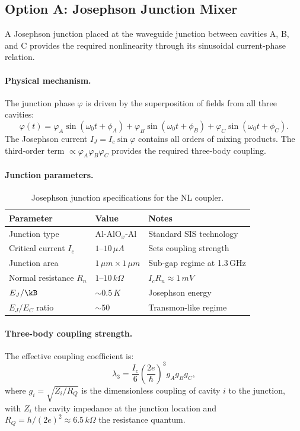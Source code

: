 \documentclass[12pt,a4paper]{article}
\begin{document}
\subsection{Option A: Josephson Junction Mixer}

A Josephson junction placed at the waveguide junction between cavities A, B, and C provides the required nonlinearity through its sinusoidal current-phase relation.

\paragraph{Physical mechanism.} The junction phase $\varphi$ is driven by the superposition of fields from all three cavities:
\begin{equation}
\varphi(t) = \varphi_A \sin(\omega_0 t + \phi_A) + \varphi_B \sin(\omega_0 t + \phi_B) + \varphi_C \sin(\omega_0 t + \phi_C).
\end{equation}
The Josephson current $I_J = I_c \sin\varphi$ contains all orders of mixing products. The third-order term $\propto \varphi_A \varphi_B \varphi_C$ provides the required three-body coupling.

\paragraph{Junction parameters.}
\begin{table}[H]
\centering
\caption{Josephson junction specifications for the NL coupler.}
\begin{tabular}{lll}
\toprule
\textbf{Parameter} & \textbf{Value} & \textbf{Notes} \\
\midrule
Junction type & Al-AlO$_x$-Al & Standard SIS technology \\
Critical current $I_c$ & $1$--$10\,\si{\mu A}$ & Sets coupling strength \\
Junction area & $1\,\si{\mu m} \times 1\,\si{\mu m}$ & Sub-gap regime at 1.3\,GHz \\
Normal resistance $R_n$ & $1$--$10\,\si{k\Omega}$ & $I_c R_n \approx 1\,\si{mV}$ \\
$E_J / \kB$ & $\sim 0.5\,\si{K}$ & Josephson energy \\
$E_J / E_C$ ratio & $\sim 50$ & Transmon-like regime \\
\bottomrule
\end{tabular}
\end{table}

\paragraph{Three-body coupling strength.} The effective coupling coefficient is:
\begin{equation}
\lambda_3 = \frac{I_c}{6}\left(\frac{2e}{\hbar}\right)^3 g_A g_B g_C,
\end{equation}
where $g_i = \sqrt{Z_i/R_Q}$ is the dimensionless coupling of cavity $i$ to the junction, with $Z_i$ the cavity impedance at the junction location and $R_Q = h/(2e)^2 \approx 6.5\,\si{k\Omega}$ the resistance quantum.
\end{document}
